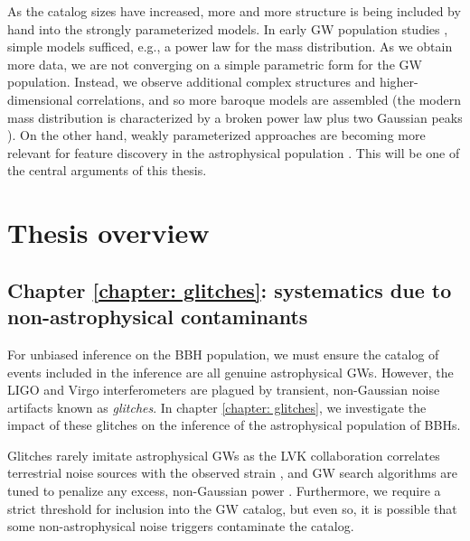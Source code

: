 \begin{refsection}
As the catalog sizes have increased, more and more structure is being included by hand into the strongly parameterized models. In early \ac{GW} population studies \citep[e.g.,][]{noauthor_population_nodate}, simple models sufficed, e.g., a power law for the mass distribution. As we obtain more data, we are not converging on a simple parametric form for the \ac{GW} population. Instead, we observe additional complex structures and higher-dimensional correlations, and so more baroque models are assembled (the modern mass distribution is characterized by a broken power law plus two Gaussian peaks \citep[e.g.,][]{abac_gwtc-40_2025}). On the other hand, weakly parameterized approaches are becoming more relevant for feature discovery in the astrophysical population \citep[e.g.,][]{Alvarez-Lopez:2025ltt}. This will be one of the central arguments of this thesis. 

\section{Thesis overview}

\subsection{Chapter \ref{chapter: glitches}: systematics due to non-astrophysical contaminants }

For unbiased inference on the \ac{BBH} population, we must ensure the catalog of events included in the inference are all genuine astrophysical \acp{GW}. However, the \ac{LIGO} and Virgo interferometers are plagued by transient, non-Gaussian noise artifacts known as \textit{glitches}. In chapter \ref{chapter: glitches}, we investigate the impact of these glitches on the inference of the astrophysical population of \acp{BBH}. 

Glitches rarely imitate astrophysical \acp{GW} as the \ac{LVK} collaboration correlates terrestrial noise sources with the observed strain \citep[e.g.,][]{Soni:2021cjy, 2021CQGra..38m5014D}, and \ac{GW} search algorithms are tuned to penalize any excess, non-Gaussian power \citep[e.g.,][]{2005PhRvD..71f2001A}. Furthermore, we require a strict threshold for inclusion into the \ac{GW} catalog, but even so, it is possible that some non-astrophysical noise triggers contaminate the catalog. 


\end{refsection}
